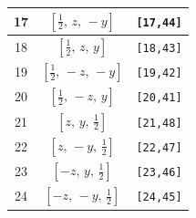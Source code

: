 \documentclass[fleqn,8pt]{jsarticle}
\begin{document}
\begin{longtable}{ccc}
17 & $\left[ \frac{1}{2},\, z,\, - y \right]$ & {\tt [17,44]} \\ \hline
18 & $\left[ \frac{1}{2},\, z,\, y \right]$ & {\tt [18,43]} \\ \hline
19 & $\left[ \frac{1}{2},\, - z,\, - y \right]$ & {\tt [19,42]} \\ \hline
20 & $\left[ \frac{1}{2},\, - z,\, y \right]$ & {\tt [20,41]} \\ \hline
21 & $\left[ z,\, y,\, \frac{1}{2} \right]$ & {\tt [21,48]} \\ \hline
22 & $\left[ z,\, - y,\, \frac{1}{2} \right]$ & {\tt [22,47]} \\ \hline
23 & $\left[ - z,\, y,\, \frac{1}{2} \right]$ & {\tt [23,46]} \\ \hline
24 & $\left[ - z,\, - y,\, \frac{1}{2} \right]$ & {\tt [24,45]} \\
\end{longtable}
\renewcommand{\arraystretch}{1.2}
\end{document}
